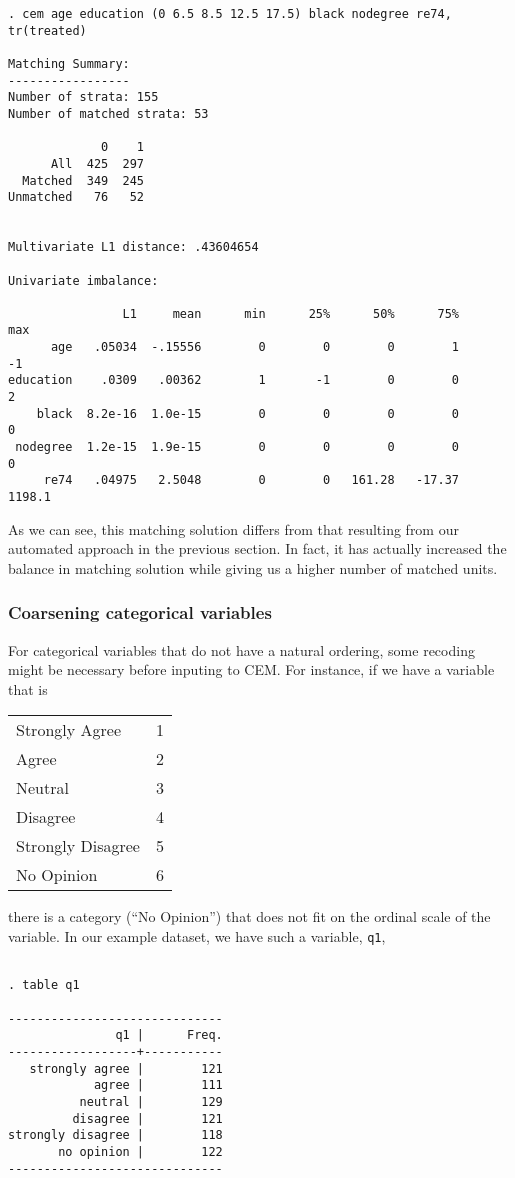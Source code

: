 \documentclass[11pt]{article}
\begin{document}
\begin{verbatim}
. cem age education (0 6.5 8.5 12.5 17.5) black nodegree re74, tr(treated)

Matching Summary:
-----------------
Number of strata: 155
Number of matched strata: 53

             0    1
      All  425  297
  Matched  349  245
Unmatched   76   52


Multivariate L1 distance: .43604654

Univariate imbalance:

                L1     mean      min      25%      50%      75%      max
      age   .05034  -.15556        0        0        0        1       -1
education    .0309   .00362        1       -1        0        0        2
    black  8.2e-16  1.0e-15        0        0        0        0        0
 nodegree  1.2e-15  1.9e-15        0        0        0        0        0
     re74   .04975   2.5048        0        0   161.28   -17.37   1198.1

\end{verbatim}

As we can see, this matching solution differs from that resulting from our
automated approach in the previous section. In fact, it has actually
increased the balance in matching solution while giving us a higher number
of matched units.

\subsubsection{Coarsening categorical variables}

For categorical variables that do not have a natural ordering, some
recoding might be necessary before inputing to CEM. For instance, if we
have a variable that is

\begin{center}
\begin{tabular}{ll}
Strongly Agree    & 1\\
Agree   & 2\\
Neutral     & 3\\
Disagree         & 4\\
Strongly Disagree & 5\\
No Opinion      & 6 
\end{tabular}
\end{center}
there is a category (``No Opinion'') that does not fit on the ordinal
scale of the variable. In our example dataset, we have such a variable,
\texttt{q1},
\begin{verbatim}

. table q1

------------------------------
               q1 |      Freq.
------------------+-----------
   strongly agree |        121
            agree |        111
          neutral |        129
         disagree |        121
strongly disagree |        118
       no opinion |        122
------------------------------
\end{verbatim}
\end{document}
